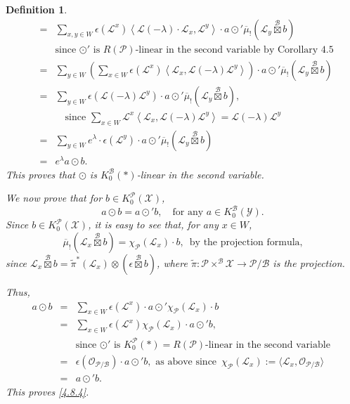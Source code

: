 \documentclass{article}
\newtheorem{definition}[theorem]{Definition}
\def\L{\mathcal{L}}
\def\P{\mathcal{P}}
\def\X{\mathcal{X}}
\def\B{\mathcal{B}}
\def\Y{\mathcal{Y}}
\def\ref#1{#1}
\begin{document}
\begin{definition}
{\begin{eqnarray*}
&=& \sum_{x,y\in W}\epsilon \left(\L^x\right) \left\langle \L(-\lambda)\cdot \L_x,\L^y\right\rangle\cdot a \odot' \overline{\mu}_! \left( \L_y \overset{\B}{\boxtimes} b\right)\\
&&\text{since $\odot'$ is $R(\P)$-linear in the second variable by Corollary \ref{4.5}}\\
&=&\sum_{y\in W}\left( \sum_{x\in W} \epsilon \left(\L^x\right) \left\langle \L_x, \L\left(-\lambda\right)\L^y \right\rangle\right) \cdot a \odot' \overline{\mu}_! \left( \L_y \overset{\B}{\boxtimes} b\right)\\
&=&\sum_{y\in W} \epsilon\left(\L\left(-\lambda\right)\L^y\right)\cdot a \odot' \overline{\mu}_! \left( \L_y \overset{\B}{\boxtimes} b\right) ,\\
&&\quad\mbox{since }\sum_{x\in W}\L^x \left\langle \L_x, \L\left(-\lambda\right)\L^y \right\rangle = \L\left(-\lambda\right)\L^y\\
&=&\sum_{y\in W}e^\lambda \cdot \epsilon \left(\L^y\right) \cdot a \odot'  \overline{\mu}_! \left( \L_y \overset{\B}{\boxtimes} b\right)\\
&=&e^\lambda a \odot b.
\end{eqnarray*}
This proves that $\odot$ is $K_0^\B(*)$-linear in the second variable. 

We now prove that for $b\in K_0^\P(\X)$, 
\begin{equation}\label{4.8.4}
a\odot b= a\odot' b, \quad \mbox{for any } a\in K_0^\B \left(\Y\right).
\end{equation}
Since $b\in K_0^\P(\X)$, it is easy to see that, for any $x\in W$, 
$$
 \overline{\mu}_! \left( \L_x\overset{\B}{\boxtimes} b\right)= \chi_\P\left(\L_x\right)\cdot b,\,\,\,\text{by the projection formula,}
 $$ since $\L_x\overset{\B}{\boxtimes} b=\tilde{\pi}^* \left(\L_x\right)\otimes \left(\epsilon \overset{\B}{\boxtimes} b\right)$, where $\tilde{\pi}: \P\times^\B \X \rightarrow \P/\B$ is the projection. 
 
 Thus, 
\begin{eqnarray*}
a\odot b &=&  \sum_{x\in W} \epsilon \left(\L^x\right) \cdot a \odot' \chi_\P\left(\L_x\right)\cdot b\\
&=& \sum_{x\in W} \epsilon \left(\L^x\right) \chi_\P\left(\L_x\right)\cdot a \odot' b,\\
&& \mbox{since $\odot'$ is $K_0^\P(*)=R(\P)$-linear in the second variable }\\
&=&\epsilon \left(\mathcal{O}_{\P/\B}\right)\cdot a \odot' b,\mbox{ as above since } \,\chi_\P(\L_x) :=\langle \L_x, \mathcal{O}_{\P/\B}\rangle\\
&=&a \odot' b.
\end{eqnarray*}
This proves \eqref{4.8.4}. 


}
\end{definition}
\end{document}
